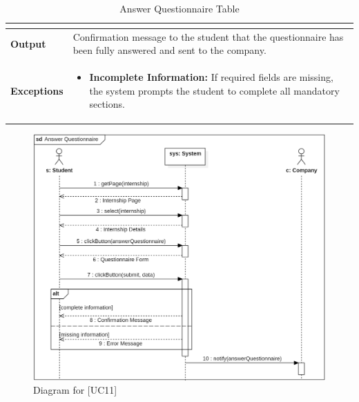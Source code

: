 \begin{table}[H]
\begin{tabular}{|p{4cm}|p{11cm}|}
{\begin{itemize}
    \end{itemize}} \\ \hline
    \textbf{Output} & 
    Confirmation message to the student that the questionnaire has been fully answered and sent to the company. \\ \hline
    \textbf{Exceptions} &
    {\setlength{\leftmargini}{1.1em}
    \begin{itemize}
        \item \textbf{Incomplete Information:} If required fields are missing, the system prompts the student to complete all mandatory sections.
    \end{itemize}} \\ \hline
    \end{tabular}
    \caption{Answer Questionnaire Table}
\end{table}

\begin{figure} [H]
    \centering
    \includegraphics[width=1\linewidth]{Use Cases Images/answer_questionnaire.png}
    \caption{Diagram for [UC11]}
    \label{fig: Answer Questionnaire Diagram}
\end{figure}


